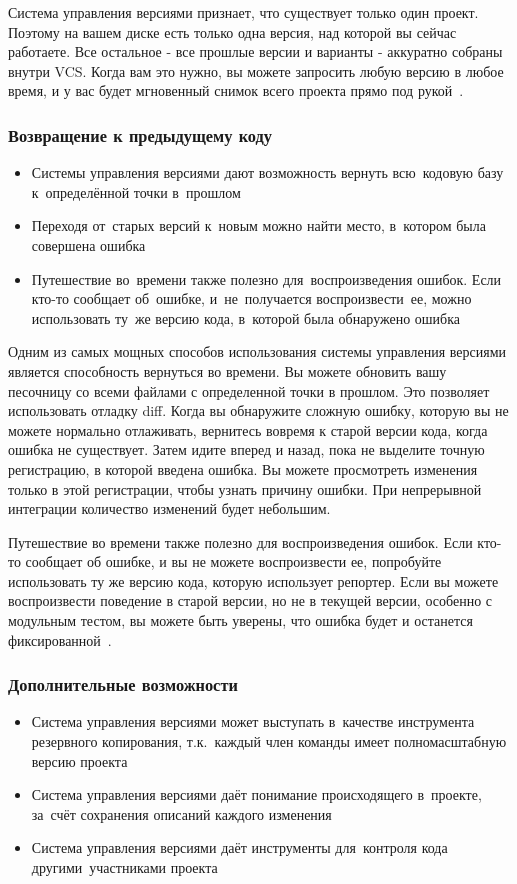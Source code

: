 \documentclass{../industrial-development}
\begin{document}
Система управления версиями признает, что существует только один проект. Поэтому на вашем диске есть только одна версия, над которой вы сейчас работаете. Все остальное - все прошлые версии и варианты - аккуратно собраны внутри VCS. Когда вам это нужно, вы можете запросить любую версию в любое время, и у вас будет мгновенный снимок всего проекта прямо под рукой~\cite{GitTower}.

\begin{frame} \frametitle{Возвращение к предыдущему коду}
  \begin{itemize}
  \item Системы управления версиями дают возможность вернуть всю~кодовую базу к~определённой точки в~прошлом
  \item Переходя от~старых версий к~новым можно найти место, в~котором была совершена ошибка
  \item Путешествие во~времени также полезно для~воспроизведения ошибок. Если кто-то сообщает об~ошибке, и~не~получается воспроизвести~ее, можно использовать ту~же версию кода, в~которой была обнаружено ошибка
  \end{itemize}
\end{frame}

\lecturenotes

Одним из самых мощных способов использования системы управления версиями является способность вернуться во времени. Вы можете обновить вашу песочницу со всеми файлами с определенной точки в прошлом.
Это позволяет использовать отладку diff. Когда вы обнаружите сложную ошибку, которую вы не можете нормально отлаживать, вернитесь вовремя к старой версии кода, когда ошибка не существует. Затем идите вперед и назад, пока не выделите точную регистрацию, в которой введена ошибка. Вы можете просмотреть изменения только в этой регистрации, чтобы узнать причину ошибки. При непрерывной интеграции количество изменений будет небольшим.

Путешествие во времени также полезно для воспроизведения ошибок. Если кто-то сообщает об ошибке, и вы не можете воспроизвести ее, попробуйте использовать ту же версию кода, которую использует репортер. Если вы можете воспроизвести поведение в старой версии, но не в текущей версии, особенно с модульным тестом, вы можете быть уверены, что ошибка будет и останется фиксированной~\cite[171]{AgileDevelopment}.


\begin{frame} \frametitle{Дополнительные возможности}
  \begin{itemize}
  \item Система управления версиями может выступать в~качестве инструмента резервного копирования, т.к.~каждый член команды имеет полномасштабную версию проекта
  \item Система управления версиями даёт понимание происходящего в~проекте, за~счёт сохранения описаний каждого изменения
  \item Система управления версиями даёт инструменты для~контроля кода другими~участниками проекта
  \end{itemize}
\end{frame}
\end{document}
